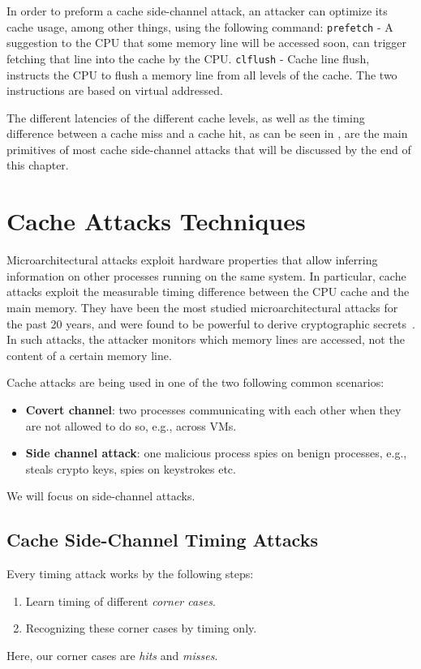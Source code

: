 In order to preform a cache side-channel attack, an attacker can optimize its cache usage, among other things, using the following command: \texttt{prefetch} - A suggestion to the CPU that some memory line will be accessed soon, can trigger fetching that line into the cache by the CPU. \texttt{clflush} - Cache line flush, instructs the CPU to flush a memory line from all levels of the cache. The two instructions are based on virtual addressed.

The different latencies of the different cache levels, as well as the timing difference between a cache miss and a cache hit, as can be seen in , are the main primitives of most cache side-channel attacks that will be discussed by the end of this chapter.  

\section{Cache Attacks Techniques} %
\label{sec:cacheattackstech}

Microarchitectural attacks exploit hardware properties that allow inferring information on other processes running on the same system.
In particular, cache attacks exploit the measurable timing difference between the CPU cache and the main memory. They have been the most studied microarchitectural attacks for the past 20 years, and were found to be powerful to derive cryptographic secrets~\cite{Percival2009}. In such attacks, the attacker monitors which memory lines are accessed, not the content of a certain memory line.

\noindent Cache attacks are being used in one of the two following common scenarios:
\begin{itemize}
\item \textbf{Covert channel}: two processes communicating with each other when they are not allowed to do so, e.g., across VMs.
\item \textbf{Side channel attack}: one malicious process spies on benign processes, e.g., steals crypto keys, spies on keystrokes etc. 
\end{itemize}
We will focus on side-channel attacks.

\subsection{Cache Side-Channel Timing Attacks}
\label{subsec:cachesidechanneltiming}
Every timing attack works by the following steps:
\begin{enumerate}
    \item Learn timing of different \textit{corner cases}.
    \item Recognizing these corner cases by timing only.
\end{enumerate}
Here, our corner cases are \textit{hits} and \textit{misses}.

